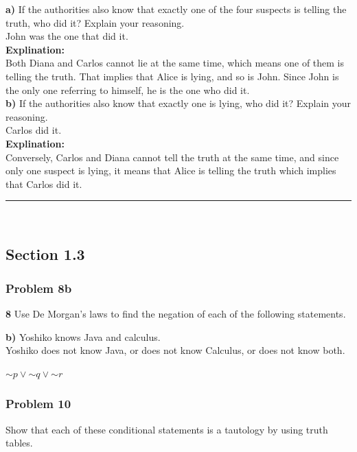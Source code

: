 \documentclass[paper=a4, fontsize=11pt]{scrartcl} %
\newcommand*{\oldneg}{\mathord{\sim}}
\newcommand{\horrule}[1]{\rule{\linewidth}{#1}} %
\begin{document}
\textbf{a)} If the authorities also know that exactly one of the
four suspects is telling the truth, who did it? Explain
your reasoning.\\

John was the one that did it.\\
\textbf{Explination:}\\
Both Diana and Carlos cannot lie at the same time, which means one of them is
telling the truth. That implies that Alice is lying, and so is John. Since John is
the only one referring to himself, he is the one who did it.\\

\textbf{b)} If the authorities also know that exactly one is lying,
who did it? Explain your reasoning.\\

Carlos did it.\\
\textbf{Explination:}\\
Conversely, Carlos and Diana cannot tell the truth at the same time, and since only one
suspect is lying, it means that Alice is telling the truth which implies that Carlos did it.\\


\horrule{0.5pt} \\ %
\subsection*{Section 1.3}
\subsubsection*{Problem 8b}

\textbf{8} Use De Morgan's laws to find the negation of each of the
following statements.

\textbf{b)} Yoshiko knows Java and calculus.\\

Yoshiko does not know Java, or does not know Calculus, or does not know both.

$\oldneg p \lor \oldneg q \lor \oldneg r$


\subsubsection*{Problem 10}
Show that each of these conditional statements is a tautology by using truth tables.
\end{document}
